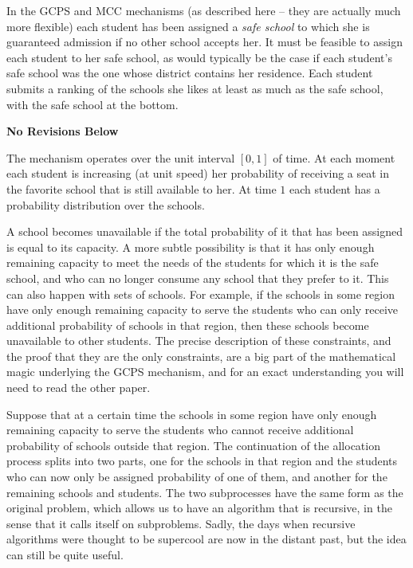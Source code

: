 \documentclass[12pt]{article}
\theoremstyle{definition}
\newcommand{\norev}{\medskip \centerline{\textbf{No Revisions Below}} \medskip}
\begin{document}
In the GCPS and MCC mechanisms (as described here -- they are actually
much more flexible) each student has been assigned a \emph{safe
school} to which she is guaranteed admission if no other school
accepts her.  It must be feasible to assign each student to her safe
school, as would typically be the case if each student's safe school
was the one whose district contains her residence.  Each student
submits a ranking of the schools she likes at least as much as the
safe school, with the safe school at the bottom.

\norev

The mechanism operates over the unit
interval $[0,1]$ of time.  At each moment each student is increasing
(at unit speed) her probability of receiving a seat in the favorite
school that is still available to her.  At time $1$ each student has a
probability distribution over the schools.

A school becomes unavailable if the total probability of it that has
been assigned is equal to its capacity.  A more subtle possibility is
that it has only enough remaining capacity to meet the needs of the
students for which it is the safe school, and who can no longer
consume any school that they prefer to it.  This can also happen with
sets of schools.  For example, if the schools in some region have only
enough remaining capacity to serve the students who can only receive
additional probability of schools in that region, then these schools
become unavailable to other students.  The precise description of
these constraints, and the proof that they are the only constraints,
are a big part of the mathematical magic underlying the GCPS
mechanism, and for an exact understanding you will need to read the
other paper.

Suppose that at a certain time the schools in some region have only
enough remaining capacity to serve the students who cannot receive
additional probability of schools outside that region.  The
continuation of the allocation process splits into two parts, one for
the schools in that region and the students who can now only be
assigned probability of one of them, and another for the remaining
schools and students.  The two subprocesses have the same form as the
original problem, which allows us to have an algorithm that is
recursive, in the sense that it calls itself on subproblems.  Sadly,
the days when recursive algorithms were thought to be supercool are
now in the distant past, but the idea can still be quite useful.
\end{document}
